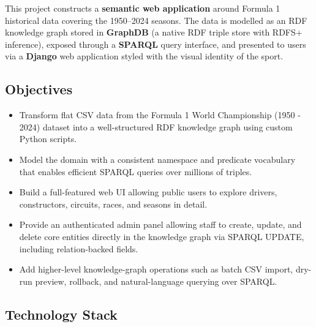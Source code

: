 \documentclass[12pt,a4paper]{article}
\begin{document}
This project constructs a \textbf{semantic web application} around Formula 1
historical data covering the 1950--2024 seasons. The data is modelled as an RDF
knowledge graph stored in \textbf{GraphDB} (a native RDF triple store with
RDFS+ inference), exposed through a \textbf{SPARQL} query interface, and
presented to users via a \textbf{Django} web application styled with the visual
identity of the sport.

\subsection{Objectives}

\begin{itemize}[leftmargin=1.5em]
  \item Transform flat CSV data from the Formula 1 World Championship (1950 - 2024) dataset into
        a well-structured RDF knowledge graph using custom Python scripts.
  \item Model the domain with a consistent namespace and predicate vocabulary
        that enables efficient SPARQL queries over millions of triples.
  \item Build a full-featured web UI allowing public users to explore drivers,
        constructors, circuits, races, and seasons in detail.
  \item Provide an authenticated admin panel allowing staff to create, update,
        and delete core entities directly in the knowledge graph via SPARQL
        UPDATE, including relation-backed fields.
  \item Add higher-level knowledge-graph operations such as batch CSV import,
        dry-run preview, rollback, and natural-language querying over SPARQL.
\end{itemize}

\subsection{Technology Stack}
\end{document}

